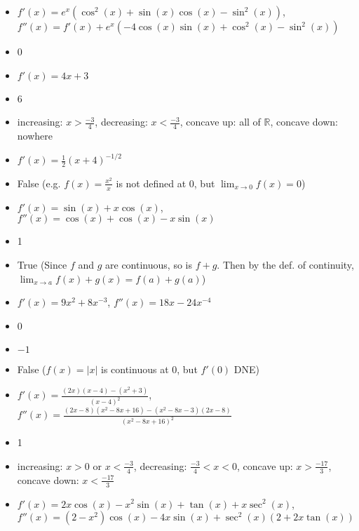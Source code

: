 \documentclass{article}
\newcommand{\R}{\mathbb{R}}
\begin{document}
\begin{itemize}
\item $f'(x)=e^{x}(\cos^{2}(x)+\sin(x)\cos(x)-\sin^{2}(x))$, $f''(x)=f'(x)+e^{x}\left(-4\cos\left(x\right)\sin\left(x\right)+\cos^{2}\left(x\right)-\sin^{2}\left(x\right)\right)$
\item 0
\item $f'(x)=4x + 3$
\item 6
\item increasing: $x>\frac{-3}{4}$, decreasing: $x<\frac{-3}{4}$, concave up: all of $\R$, concave down: nowhere
\item $f'(x)=\frac{1}{2}(x+4)^{-1/2}$
\item False (e.g. $f(x)=\frac{x^2}{x}$ is not defined at 0, but $\lim_{x\to 0}f(x) = 0$)
\item $f'(x)=\sin(x) + x\cos(x)$, $f''(x)=\cos(x) + \cos(x) -x\sin(x)$
\item 1
\item True (Since $f$ and $g$ are continuous, so is $f+g$. Then by the def. of continuity, $\lim_{x\to a} f(x)+g(x)=f(a) + g(a)$)
\item $f'(x)=9x^2+8x^{-3}$, $f''(x)=18x-24x^{-4}$
\item 0
\item $-1$
\item False ($f(x)=|x|$ is continuous at $0$, but $f'(0)$ DNE)
\item $f'(x)=\frac{(2x)(x-4)-(x^2+3)}{(x-4)^2}$, $f''(x)=\frac{(2x-8)(x^2-8x+16)-(x^2-8x-3)(2x-8)}{(x^2-8x+16)^2}$
\item 1
\item increasing: $x>0$ or $x<\frac{-3}{4}$, decreasing: $\frac{-3}{4}<x<0$, concave up: $x>\frac{-17}{3}$, concave down: $x<\frac{-17}{3}$
\item $f'(x)=2x\cos(x)-x^2\sin(x)+\tan(x)+x\sec^2(x)$, $f''(x)=\left(2-x^{2}\right)\cos\left(x\right)-4x\sin\left(x\right)+\sec^{2}\left(x\right)\left(2+2x\tan\left(x\right)\right)$
\end{itemize}
\end{document}

